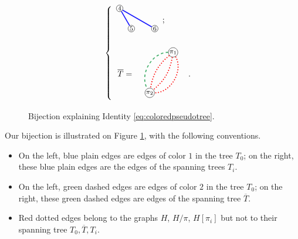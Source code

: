 \documentclass[12pt,a4paper,reqno]{amsart}
\theoremstyle{remark}
\begin{document}
\begin{center}
\begin{figure}[ht]
$$\begin{cases}
\begin{array}{c}
\begin{tikzpicture}
    \tikzstyle{vertex1}=[circle,draw,inner sep=0.5pt,minimum size=1mm]
    \tikzstyle{vertex2}=[rectangle,draw,inner sep=1.5pt,minimum size=1mm]
    \tikzstyle{rededge}=[red, dotted,thick,line width=1.2pt]
    \tikzstyle{blueedge}=[blue!90!white,thick,line width=1.2pt]
    \tikzstyle{greenedge}=[ForestGreen!80!white, dashed,thick,line width=1.2pt]
    \node (v4) at (180:1) [vertex1] {\footnotesize $4$};
    \node (v5) at (240:1) [vertex1] {\footnotesize $5$};
    \node (v6) at (300:1) [vertex1] {\footnotesize $6$};
    \draw [blueedge] (v4) to (v5);
    \draw [blueedge] (v4) to (v6);
        \end{tikzpicture} 
        \end{array};\\
        \\
        \,\,\,\,\overline{T}=\begin{array}{c}
        \begin{tikzpicture}
    \tikzstyle{vertex1}=[circle,draw,inner sep=0.5pt,minimum size=1mm]
    \tikzstyle{vertex2}=[rectangle,draw,inner sep=1.5pt,minimum size=1mm]
    \tikzstyle{rededge}=[red, dotted,thick,line width=1.2pt]
    \tikzstyle{blueedge}=[blue!90!white,thick,line width=1.2pt]
    \tikzstyle{greenedge}=[ForestGreen!80!white, dashed,thick,line width=1.2pt]
    \node (v123) at (60:1) [vertex1] {\footnotesize $\pi_1$};
    \node (v456) at (240:1) [vertex1] {\footnotesize $\pi_2$};
    \draw [rededge] (v123) to [bend right=-60] (v456);
    \draw [rededge] (v123) to [bend right=20] (v456);
    \draw [rededge] (v123) to [bend right=-20] (v456);
    \draw [greenedge] (v123) to [bend right=60] (v456);
\end{tikzpicture}
        \end{array}.
        \end{cases}
$$
    \caption{Bijection explaining Identity \eqref{eq:coloredpseudotree}.}
    \label{fig:partitionspanningtrees}
\end{figure}
\end{center}
Our bijection is illustrated on Figure \ref{fig:partitionspanningtrees}, with the following conventions.\vspace{1.5mm}
\begin{itemize}
    \item On the left, blue plain edges are edges of color $1$ in the tree $T_0$; on the right, these blue plain edges are the edges of the spanning trees $T_i$.\vspace{1.5mm}
    \item On the left, green dashed edges are edges of color $2$ in the tree $T_0$; on the right, these green dashed edges are edges of the spanning tree $\overline{T}$.\vspace{1.5mm}
    \item Red dotted edges belong to the graphs $H$, $H/\pi$, $H[\pi_i]$ but not to their spanning tree $T_0,\overline{T},T_i$.\vspace{1.5mm}
\end{itemize}
\end{document}
